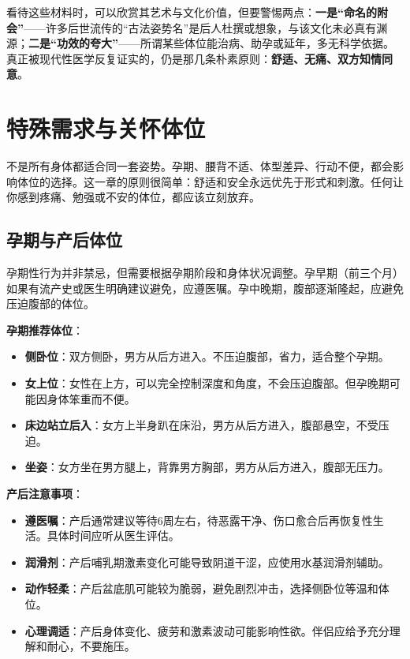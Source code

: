 \documentclass[12pt,UTF8]{ctexbook}
\begin{document}
看待这些材料时，可以欣赏其艺术与文化价值，但要警惕两点：\textbf{一是“命名的附会”}——许多后世流传的“古法姿势名”是后人杜撰或想象，与该文化未必真有渊源；\textbf{二是“功效的夸大”}——所谓某些体位能治病、助孕或延年，多无科学依据。真正被现代性医学反复证实的，仍是那几条朴素原则：\textbf{舒适、无痛、双方知情同意}。

\chapter{特殊需求与关怀体位}

不是所有身体都适合同一套姿势。孕期、腰背不适、体型差异、行动不便，都会影响体位的选择。这一章的原则很简单：舒适和安全永远优先于形式和刺激。任何让你感到疼痛、勉强或不安的体位，都应该立刻放弃。

\section{孕期与产后体位}

孕期性行为并非禁忌，但需要根据孕期阶段和身体状况调整。孕早期（前三个月）如果有流产史或医生明确建议避免，应遵医嘱。孕中晚期，腹部逐渐隆起，应避免压迫腹部的体位。

\textbf{孕期推荐体位}：

\begin{itemize}
\item \textbf{侧卧位}：双方侧卧，男方从后方进入。不压迫腹部，省力，适合整个孕期。
\item \textbf{女上位}：女性在上方，可以完全控制深度和角度，不会压迫腹部。但孕晚期可能因身体笨重而不便。
\item \textbf{床边站立后入}：女方上半身趴在床沿，男方从后方进入，腹部悬空，不受压迫。
\item \textbf{坐姿}：女方坐在男方腿上，背靠男方胸部，男方从后方进入，腹部无压力。
\end{itemize}

\textbf{产后注意事项}：

\begin{itemize}
\item \textbf{遵医嘱}：产后通常建议等待6周左右，待恶露干净、伤口愈合后再恢复性生活。具体时间应听从医生评估。
\item \textbf{润滑剂}：产后哺乳期激素变化可能导致阴道干涩，应使用水基润滑剂辅助。
\item \textbf{动作轻柔}：产后盆底肌可能较为脆弱，避免剧烈冲击，选择侧卧位等温和体位。
\item \textbf{心理调适}：产后身体变化、疲劳和激素波动可能影响性欲。伴侣应给予充分理解和耐心，不要施压。
\end{itemize}
\end{document}
